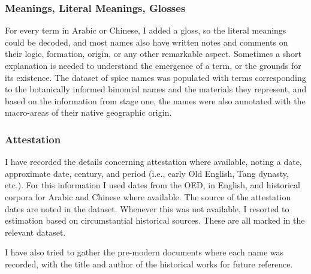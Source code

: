 


\subsubsection{Meanings, Literal Meanings, Glosses}

For every term in Arabic or Chinese, I added a gloss, so the literal meanings could be decoded, and most names also have written notes and comments on their logic, formation, origin, or any other remarkable aspect. Sometimes a short explanation is needed to understand the emergence of a term, or the grounds for its existence. The dataset of spice names was populated with terms corresponding to the botanically informed binomial names and the materials they represent, and based on the information from stage one, the names were also annotated with the macro-areas of their native geographic origin.


\subsubsection{Attestation}

I have recorded the details concerning attestation where available, noting a date, approximate date, century, and period (i.e., early Old English, Tang dynasty, etc.). For this information I used dates from the \gls{OED}, in English, and historical corpora for Arabic and Chinese where available. The source of the attestation dates are noted in the dataset. Whenever this was not available, I resorted to estimation based on circumstantial historical sources. These are all marked in the relevant dataset.

I have also tried to gather the pre-modern documents where each name was recorded, with the title and author of the historical works for future reference. %



